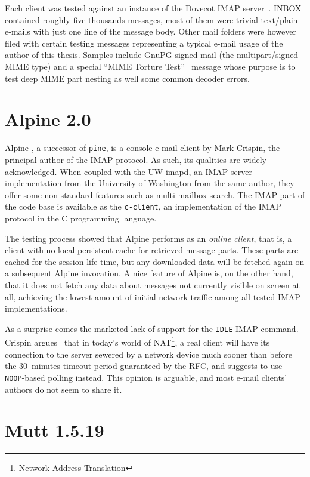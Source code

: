 \documentclass[12pt,notitlepage]{report}
\begin{document}
Each client was tested against an instance of the Dovecot IMAP
server~\cite{dovecot}.  INBOX contained roughly five thousands messages, most of
them were trivial text/plain e-mails with just one line of the message body.
Other mail folders were however filed with certain testing messages representing
a typical e-mail usage of the author of this thesis.  Samples include GnuPG
signed mail (the multipart/signed MIME type) and a special ``MIME Torture
Test''~\cite{mime-torture-test} message whose purpose is to test deep MIME part
nesting as well some common decoder errors.

\section{Alpine 2.0}

Alpine \cite{alpine}, a successor of {\tt pine}, is a console e-mail client by
Mark Crispin, the principal author of the IMAP protocol.  As such, its qualities
are widely acknowledged.  When coupled with the UW-imapd, an IMAP server
implementation from the University of Washington from the same author, they
offer some non-standard features such as multi-mailbox search.  The IMAP part of
the code base is available as the {\tt c-client}, an implementation of the IMAP
protocol in the C programming language.

The testing process showed that Alpine performs as an {\em online client}, that
is, a client with no local persistent cache for retrieved message parts.  These
parts are cached for the session life time, but any downloaded data will be
fetched again on a subsequent Alpine invocation.  A nice feature of Alpine is,
on the other hand, that it does not fetch any data about messages not currently
visible on screen at all, achieving the lowest amount of initial network traffic
among all tested IMAP implementations.

As a surprise comes the marketed lack of support for the {\tt IDLE} IMAP
command.  Crispin argues~\cite{pine-idle} that in today's world of
NAT\footnote{Network Address Translation}, a real client will have its
connection to the server sewered by a network device much sooner than before the
30~minutes timeout period guaranteed by the RFC, and suggests to use {\tt
NOOP}-based polling instead.  This opinion is arguable, and most e-mail clients'
authors do not seem to share it.

\section{Mutt 1.5.19}
\end{document}
